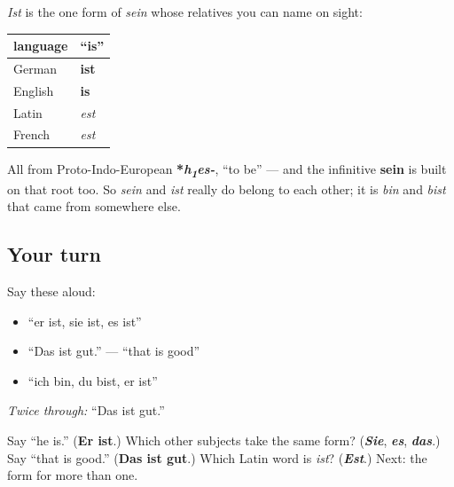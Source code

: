 \begin{cousinweb}
\emph{Ist} is the one form of \emph{sein} whose relatives you can name on sight:

\noindent
\begin{tabularx}{\linewidth}{@{}>{\raggedright\arraybackslash}X>{\raggedright\arraybackslash}X@{}}
\toprule
\textbf{language} & \textbf{\textquotedblleft{}is\textquotedblright{}} \\
\midrule
German & \textbf{ist} \\
English & \textbf{is} \\
Latin & \emph{est} \\
French & \emph{est} \\
\bottomrule
\end{tabularx}

All from Proto-Indo-European \textbf{*\emph{h\textsubscript{1}es-}}, \textquotedblleft{}to be\textquotedblright{} — and the infinitive \textbf{sein} is built on that root too. So \emph{sein} and \emph{ist} really do belong to each other; it is \emph{bin} and \emph{bist} that came from somewhere else.
\end{cousinweb}

\subsection*{Your turn}
Say these aloud:

\begin{itemize}
\raggedright
  \item \textquotedblleft{}er ist, sie ist, es ist\textquotedblright{}
  \item \textquotedblleft{}Das ist gut.\textquotedblright{} — \textquotedblleft{}that is good\textquotedblright{}
  \item \textquotedblleft{}ich bin, du bist, er ist\textquotedblright{}
\end{itemize}

\emph{Twice through:} \textquotedblleft{}Das ist gut.\textquotedblright{}

\begin{tcolorbox}[breakable,colback=teal!4,colframe=teal!35!black,title={Before you move on}]
Say \textquotedblleft{}he is.\textquotedblright{} (\textbf{Er ist}.) Which other subjects take the same form? (\emph{\textbf{Sie}}, \emph{\textbf{es}}, \emph{\textbf{das}}.) Say \textquotedblleft{}that is good.\textquotedblright{} (\textbf{Das ist gut}.) Which Latin word is \emph{ist}? (\emph{\textbf{Est}}.) Next: the form for more than one.
\end{tcolorbox}
